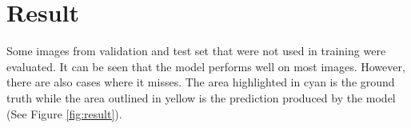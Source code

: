 \section{Result}

Some images from validation and test set that were not used in training were evaluated. It can be seen that the model performs well on most images. However, there are also cases where it misses. The area highlighted in cyan is the ground truth while the area outlined in yellow is the prediction produced by the model (See Figure \ref{fig:result}). 